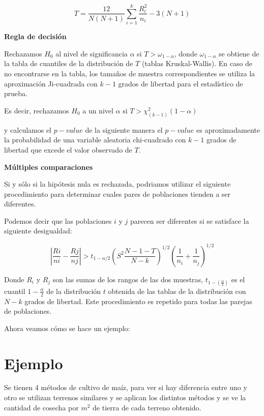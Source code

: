 \documentclass[
  a4paper,
  oneside,
  openany]{book}
\begin{document}
\[ T= \frac{12}{N(N+1)}\sum_{i=1}^{k}\frac{R^2_{i}}{n_{i}}-3(N+1) \]

\textbf{Regla de decisión}

Rechazamos \(H_0\) al nivel de significancia \(\alpha\) si \(T>\omega_{1-\alpha}\), donde \(\omega_{1-\alpha}\) se obtiene de la tabla de cuantiles de la distribución de \(T\) (tablas Kruskal-Wallis). En caso de no encontrarse en la tabla, los tamaños de muestra correspondientes se utiliza la aproximación Ji-cuadrada con \(k-1\) grados de libertad para el estadístico de prueba.

Es decir, rechazamos \(H_0\) a un nivel \(\alpha\) si \(T > \chi^2_{(k-1)}(1-\alpha)\)

y calculamos el \(p-value\) de la siguiente manera el \(p-value\) es aproximadamente la probabilidad de una variable aleatoria chi-cuadrado con \(k-1\) grados de libertad que excede el valor observado de \(T\).

\textbf{Múltiples comparaciones}

Si y sólo si la hipótesis nula es rechazada, podriamos utilizar el siguiente procedimiento para determinar cuales pares de poblaciones tienden a ser diferentes.

Podemos decir que las poblaciones \(i\) y \(j\) parecen ser diferentes si se satisface la siguiente desigualdad:

\[\left|\frac{Ri}{ni}- \frac{Rj}{nj}\right|> t_{1-\alpha/2}\left(S^2\frac{N-1-T}{N-k}\right)^{1/2}\left(\frac{1}{n_i}+\frac{1}{n_j}\right)^{1/2}\]

Donde \(R_i\) y \(R_j\) son las sumas de los rangos de las dos muestras, \(t_{1-(\frac{\alpha}{2})}\) es el cuantil \(1-\frac{\alpha}{2}\) de la distribución \(t\) obtenida de las tablas de la distribución con \(N-k\) grados de libertad. Este procedimiento es repetido para todas las parejas de poblaciones.

Ahora veamos cómo se hace un ejemplo:

\hypertarget{ejemplo-6}{%
\section{Ejemplo}\label{ejemplo-6}}

Se tienen 4 métodos de cultivo de maíz, para ver si hay diferencia entre uno y otro se utilizan terrenos similares y se aplican los distintos métodos y se ve la cantidad de cosecha por \(m^2\) de tierra de cada terreno obtenido.
\end{document}
